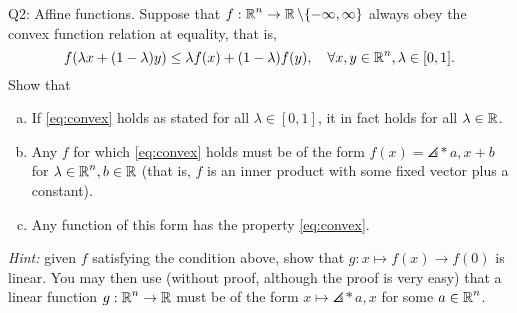 \documentclass{article}
\begin{document}
\begin{problem}
    {Q2: Affine functions.}
    Suppose that $f:\operatorname{\mathbb{R}}^n\rightarrow\operatorname{\mathbb{R}}\backslash\{-\infty,\infty\}$ always obey the convex function relation at equality, that is,
    \begin{equation}
        \label{eq:convex}
        f(\lambda x+(1-\lambda)y) \leq \lambda f(x)+(1-\lambda)f(y),\quad \forall x,y\in\operatorname{\mathbb{R}}^n,\lambda\in[0,1].
    \end{equation}
    Show that
    \begin{enumerate}[(a)]
        \item If \cref{eq:convex} holds as stated for all $\lambda\in[0,1]$, it in fact holds for all $\lambda\in\operatorname{\mathbb{R}}$.\label{item:convex}
        \item Any $f$ for which \cref{eq:convex} holds must be of the form $f(x)=\angles*{a,x}+b$ for $\lambda\in\operatorname{\mathbb{R}}^n,b\in\operatorname{\mathbb{R}}$ (that is, $f$ is an inner product with some fixed vector plus a constant).
        \item Any function of this form has the property \cref{eq:convex}.
    \end{enumerate}
    \textit{Hint:} given $f$ satisfying the condition above, show that $g:x\mapsto f(x)\rightarrow f(0)$ is linear. You may then use (without proof, although the proof is very easy) that a linear function $g: \operatorname{\mathbb{R}}^n \rightarrow \operatorname{\mathbb{R}}$ must be of the form $x \mapsto \angles*{a,x}$ for some $a \in \operatorname{\mathbb{R}}^n$.
\end{problem}
\end{document}

